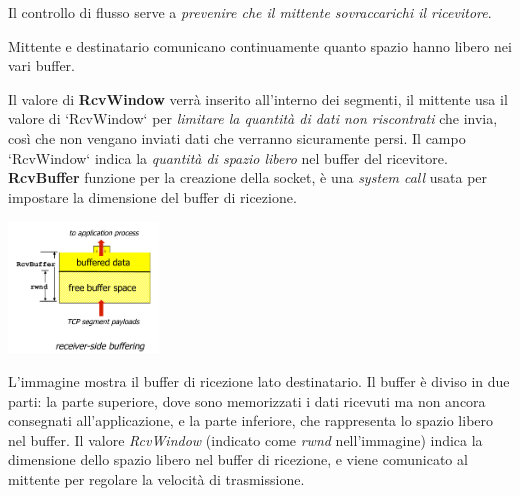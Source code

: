 Il controllo di flusso serve a \textit{prevenire che il mittente sovraccarichi il ricevitore}.

Mittente e destinatario comunicano continuamente quanto spazio hanno libero nei vari buffer.

Il valore di \textbf{RcvWindow} verrà inserito all'interno dei segmenti, il mittente usa il valore di `RcvWindow` per \textit{limitare la quantità di dati non riscontrati} che invia, così che non vengano inviati dati che verranno sicuramente persi. Il campo `RcvWindow` indica la \textit{quantità di spazio libero} nel buffer del ricevitore.
\textbf{RcvBuffer} funzione per la creazione della socket, è una \textit{system call} usata per impostare la dimensione del buffer di ricezione.

\begin{center}
\includegraphics[width=0.3\textwidth]{./img/tcpflowcontrol.png}
\end{center}

L'immagine mostra il buffer di ricezione lato destinatario. Il buffer è diviso in due parti: la parte superiore, dove sono memorizzati i dati ricevuti ma non ancora consegnati all'applicazione, e la parte inferiore, che rappresenta lo spazio libero nel buffer. Il valore \textit{RcvWindow} (indicato come \textit{rwnd} nell'immagine) indica la dimensione dello spazio libero nel buffer di ricezione, e viene comunicato al mittente per regolare la velocità di trasmissione.

